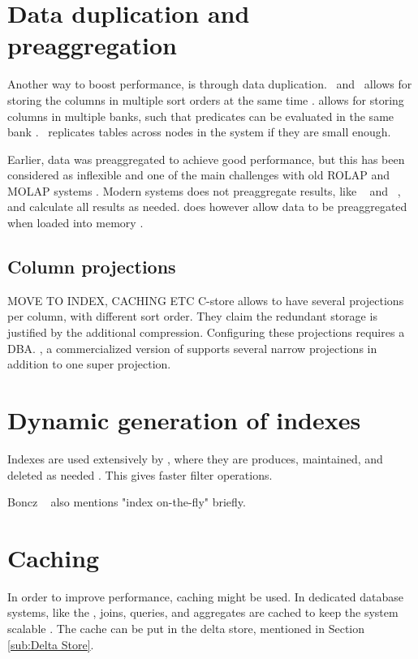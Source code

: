 \section{Data duplication and preaggregation}
\label{sec:Data duplication and preaggregation}
Another way to boost performance, is through data duplication. \cstore~and \vertica~allows for storing the columns in multiple sort orders at the same time \cite{Stonebraker2005-qz, Lamb2012-kg}. \blink allows for storing columns in multiple banks, such that predicates can be evaluated in the same bank \cite{Johnson2008-cp}. \exasol~replicates tables across nodes in the system if they are small enough.

Earlier, data was preaggregated to achieve good performance, but this has been considered as inflexible and one of the main challenges with old ROLAP and MOLAP systems \cite{Boncz2002-yj}. Modern systems does not preaggregate results, like \sapnw~\cite{Lemke2010-is} and \qlikview~\cite{Qlik2014-vd}, and calculate all results as needed. \qlikview does however allow data to be preaggregated when loaded into memory \cite{Qlik2011-yc}.

\subsection{Column projections} MOVE TO INDEX, CACHING ETC
\label{sub:Column projections} 
C-store allows to have several projections per column, with different sort order. They claim the redundant storage is justified by the additional compression. Configuring these projections requires a DBA. , a commercialized version of  supports several narrow projections in addition to one super projection.

\section{Dynamic generation of indexes}
\label{sec:Dynamic generation of indexes}
Indexes are used extensively by \exasol, where they are produces, maintained, and deleted as needed \cite{Exasol2014-xh}. This gives faster filter operations.

Boncz \ea~\cite{Boncz2006-md} also mentions "index on-the-fly" briefly.

\section{Caching}
\label{sec:Caching}
In order to improve performance, caching might be used. In dedicated database systems, like the \exasol, joins, queries, and aggregates are cached to keep the system scalable \cite{Exasol2014-xh, Plattner2014-fr}. The cache can be put in the delta store, mentioned in Section \ref{sub:Delta Store}.

